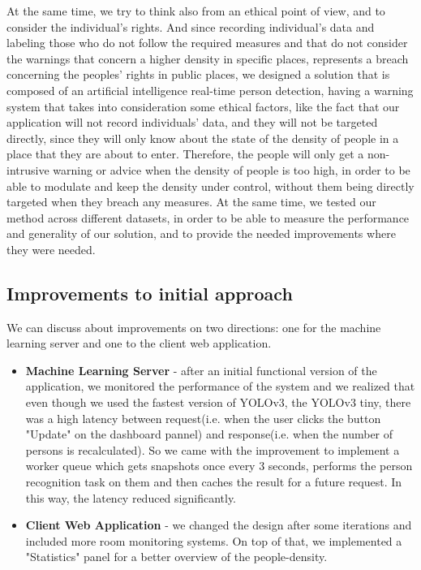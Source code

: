 \documentclass[runningheads,a4paper,11pt]{report}
\begin{document}
At the same time, we try to think also from an ethical point of view, and to consider the individual's rights. And since recording individual's data and labeling those who do not follow the required measures and that do not consider the warnings that concern a higher density in specific places, represents a breach concerning the peoples' rights in public places, we designed a solution that is composed of an artificial intelligence real-time person detection, having a warning system that takes into consideration some ethical factors, like the fact that our application will not record individuals' data, and they will not be targeted directly, since they will only know about the state of the density of people in a place that they are about to enter. Therefore, the people will only get a non-intrusive warning or advice when the density of people is too high, in order to be able to modulate and keep the density under control, without them being directly targeted when they breach any measures.
At the same time, we tested our method across different datasets, in order to be able to measure the performance and generality of our solution, and to provide the needed improvements where they were needed.

\subsection{Improvements to initial approach}
We can discuss about improvements on two directions: one for the machine learning server and one to the client web application.
\begin{itemize}
    \item \textbf{Machine Learning Server} - after an initial functional version of the application, we monitored the performance of the system and we realized that even though we used the fastest version of YOLOv3, the YOLOv3 tiny, there was a high latency between request(i.e. when the user clicks the button "Update" on the dashboard pannel) and response(i.e. when the number of persons is recalculated). So we came with the improvement to implement a worker queue which gets snapshots once every 3 seconds, performs the person recognition task on them and then caches the result for a future request. In this way, the latency reduced significantly. 
    \item \textbf{Client Web Application} - we changed the design after some iterations and included more room monitoring systems. On top of that, we implemented a "Statistics" panel for a better overview of the people-density.
\end{itemize}
\end{document}
